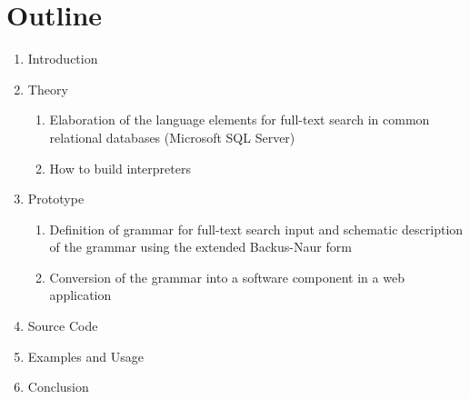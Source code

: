\section{Outline}
\begin{enumerate}
    \item Introduction
    \item Theory
    \begin{enumerate}
        \item Elaboration of the language elements for full-text search in common relational databases (Microsoft SQL Server)
        \item How to build interpreters
    \end{enumerate}
    \item Prototype
    \begin{enumerate}
        \item Definition of grammar for full-text search input and schematic description of the grammar using the extended Backus-Naur form
        \item Conversion of the grammar into a software component in a web application
    \end{enumerate}
    \item Source Code
    \item Examples and Usage
    \item Conclusion
\end{enumerate}
